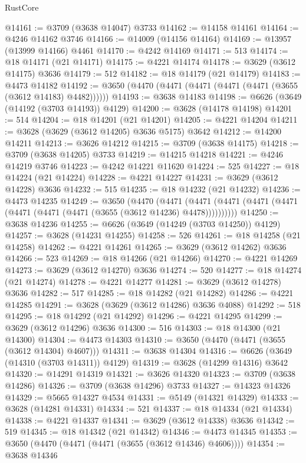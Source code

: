 \begin{lexlean}{RustCore}
\begin{coremodule}
@14161 := @3709 (@3638 @14047) @3733
@14162 := @14158 @14161
@14164 := @4246 @14162 @3746
@14166 := @14009 (@14156 @14164)
@14169 := @13957 (@13999 @14166) @4461
@14170 := @4242 @14169
@14171 := 513
@14174 := @18 @14171 (@21 @14171)
@14175 := @4221 @14174
@14178 := @3629 (@3612 @14175) @3636
@14179 := 512
@14182 := @18 @14179 (@21 @14179)
@14183 := @4473 @14182
@14192 := @3650 (@4470 (@4471 (@4471 (@4471 (@4471 (@3655 (@3612 @14183) @4482))))))
@14193 := @3638 @14183
@14198 := @6626 (@3649 (@14192 (@3703 @14193)) @4129)
@14200 := @3628 (@14178 @14198)
@14201 := 514
@14204 := @18 @14201 (@21 @14201)
@14205 := @4221 @14204
@14211 := @3628 (@3629 (@3612 @14205) @3636 @5175) @3642
@14212 := @14200 @14211
@14213 := @3626 @14212
@14215 := @3709 (@3638 @14175)
@14218 := @3709 (@3638 @14205) @3733
@14219 := @14215 @14218
@14221 := @4246 @14219 @3746
@14223 := @4242 @14221 @11620
@14224 := 525
@14227 := @18 @14224 (@21 @14224)
@14228 := @4221 @14227
@14231 := @3629 (@3612 @14228) @3636
@14232 := 515
@14235 := @18 @14232 (@21 @14232)
@14236 := @4473 @14235
@14249 := @3650
    (@4470
      (@4471 (@4471 (@4471 (@4471 (@4471 (@4471 (@4471 (@4471 (@3655 (@3612 @14236) @4478))))))))))
@14250 := @3638 @14236
@14255 := @6626 (@3649 (@14249 (@3703 @14250)) @4129)
@14257 := @3628 (@14231 @14255)
@14258 := 526
@14261 := @18 @14258 (@21 @14258)
@14262 := @4221 @14261
@14265 := @3629 (@3612 @14262) @3636
@14266 := 523
@14269 := @18 @14266 (@21 @14266)
@14270 := @4221 @14269
@14273 := @3629 (@3612 @14270) @3636
@14274 := 520
@14277 := @18 @14274 (@21 @14274)
@14278 := @4221 @14277
@14281 := @3629 (@3612 @14278) @3636
@14282 := 517
@14285 := @18 @14282 (@21 @14282)
@14286 := @4221 @14285
@14291 := @3628 (@3629 (@3612 @14286) @3636 @4088)
@14292 := 518
@14295 := @18 @14292 (@21 @14292)
@14296 := @4221 @14295
@14299 := @3629 (@3612 @14296) @3636
@14300 := 516
@14303 := @18 @14300 (@21 @14300)
@14304 := @4473 @14303
@14310 := @3650 (@4470 (@4471 (@3655 (@3612 @14304) @4607)))
@14311 := @3638 @14304
@14316 := @6626 (@3649 (@14310 (@3703 @14311)) @4129)
@14319 := @3628 (@14299 @14316) @3642
@14320 := @14291 @14319
@14321 := @3626 @14320
@14323 := @3709 (@3638 @14286)
@14326 := @3709 (@3638 @14296) @3733
@14327 := @14323 @14326
@14329 := @5665 @14327 @4534
@14331 := @5149 (@14321 @14329)
@14333 := @3628 (@14281 @14331)
@14334 := 521
@14337 := @18 @14334 (@21 @14334)
@14338 := @4221 @14337
@14341 := @3629 (@3612 @14338) @3636
@14342 := 519
@14345 := @18 @14342 (@21 @14342)
@14346 := @4473 @14345
@14353 := @3650 (@4470 (@4471 (@4471 (@3655 (@3612 @14346) @4606))))
@14354 := @3638 @14346

\end{coremodule}
\end{lexlean}
